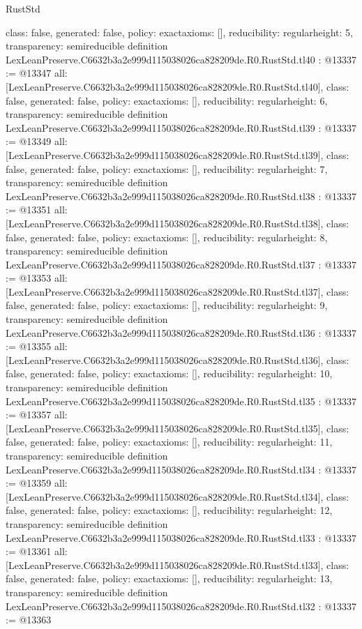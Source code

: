 \begin{lexlean}{RustStd}
\begin{coremodule}
{  class: false,
  generated: false,
  policy: exact{axioms: []},
  reducibility: regular{height: 5},
  transparency: semireducible
}
definition LexLeanPreserve.C6632b3a2e999d115038026ca828209de.R0.RustStd.tl40 : @13337 := @13347 {
  all: [LexLeanPreserve.C6632b3a2e999d115038026ca828209de.R0.RustStd.tl40],
  class: false,
  generated: false,
  policy: exact{axioms: []},
  reducibility: regular{height: 6},
  transparency: semireducible
}
definition LexLeanPreserve.C6632b3a2e999d115038026ca828209de.R0.RustStd.tl39 : @13337 := @13349 {
  all: [LexLeanPreserve.C6632b3a2e999d115038026ca828209de.R0.RustStd.tl39],
  class: false,
  generated: false,
  policy: exact{axioms: []},
  reducibility: regular{height: 7},
  transparency: semireducible
}
definition LexLeanPreserve.C6632b3a2e999d115038026ca828209de.R0.RustStd.tl38 : @13337 := @13351 {
  all: [LexLeanPreserve.C6632b3a2e999d115038026ca828209de.R0.RustStd.tl38],
  class: false,
  generated: false,
  policy: exact{axioms: []},
  reducibility: regular{height: 8},
  transparency: semireducible
}
definition LexLeanPreserve.C6632b3a2e999d115038026ca828209de.R0.RustStd.tl37 : @13337 := @13353 {
  all: [LexLeanPreserve.C6632b3a2e999d115038026ca828209de.R0.RustStd.tl37],
  class: false,
  generated: false,
  policy: exact{axioms: []},
  reducibility: regular{height: 9},
  transparency: semireducible
}
definition LexLeanPreserve.C6632b3a2e999d115038026ca828209de.R0.RustStd.tl36 : @13337 := @13355 {
  all: [LexLeanPreserve.C6632b3a2e999d115038026ca828209de.R0.RustStd.tl36],
  class: false,
  generated: false,
  policy: exact{axioms: []},
  reducibility: regular{height: 10},
  transparency: semireducible
}
definition LexLeanPreserve.C6632b3a2e999d115038026ca828209de.R0.RustStd.tl35 : @13337 := @13357 {
  all: [LexLeanPreserve.C6632b3a2e999d115038026ca828209de.R0.RustStd.tl35],
  class: false,
  generated: false,
  policy: exact{axioms: []},
  reducibility: regular{height: 11},
  transparency: semireducible
}
definition LexLeanPreserve.C6632b3a2e999d115038026ca828209de.R0.RustStd.tl34 : @13337 := @13359 {
  all: [LexLeanPreserve.C6632b3a2e999d115038026ca828209de.R0.RustStd.tl34],
  class: false,
  generated: false,
  policy: exact{axioms: []},
  reducibility: regular{height: 12},
  transparency: semireducible
}
definition LexLeanPreserve.C6632b3a2e999d115038026ca828209de.R0.RustStd.tl33 : @13337 := @13361 {
  all: [LexLeanPreserve.C6632b3a2e999d115038026ca828209de.R0.RustStd.tl33],
  class: false,
  generated: false,
  policy: exact{axioms: []},
  reducibility: regular{height: 13},
  transparency: semireducible
}
definition LexLeanPreserve.C6632b3a2e999d115038026ca828209de.R0.RustStd.tl32 : @13337 := @13363 {
}
\end{coremodule}
\end{lexlean}
